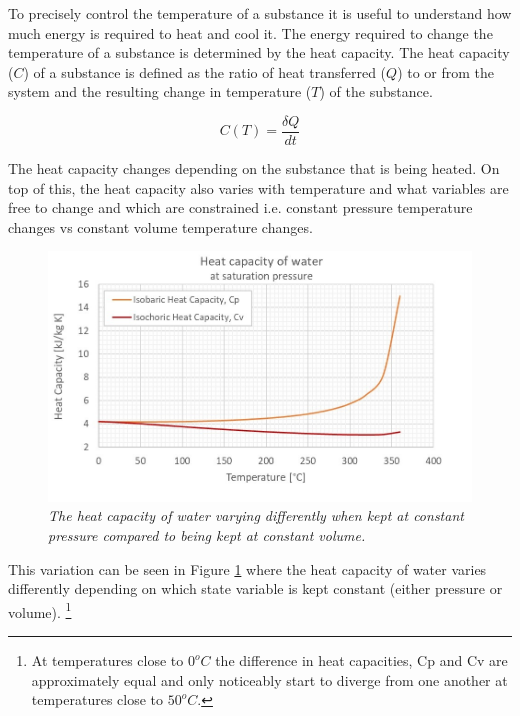 \documentclass[10pt]{article}
\begin{document}
To precisely control the temperature of a substance it is useful to understand how much energy is required to heat and cool it. The energy required to change the temperature of a substance is determined by the heat capacity. The heat capacity ($C$) of a substance is defined as the ratio of heat transferred ($Q$) to or from the system and the resulting change in temperature ($T$) of the substance.  %

\begin{equation}\label{eq:heat_cap}
    C(T) = \frac{\delta Q}{dt}
\end{equation}

The heat capacity changes depending on the substance that is being heated. On top of this, the heat capacity also varies with temperature and what variables are free to change and which are constrained i.e. constant pressure temperature changes vs constant volume temperature changes.\\

\begin{figure}[h!]
    \centering
    \includegraphics[scale=.75]{Heat_capacity_C.jpg}
    \caption{\it{The heat capacity of water varying differently when kept at constant pressure compared to being kept at constant volume\cite{heat_cap}.}}
    \label{fig:heat_cap_water}
\end{figure}

This variation can be seen in Figure \ref{fig:heat_cap_water} where the heat capacity of water varies differently depending on which state variable is kept constant (either pressure or volume). \footnote{At temperatures close to $0^oC$ the difference in heat capacities, Cp and Cv are approximately equal and only noticeably start to diverge from one another at temperatures close to $50^oC$.}\\
\end{document}
